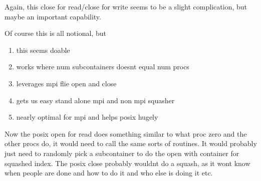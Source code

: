 Again, this close for read/close for write seems to be a slight
complication, but maybe an important capability.

Of course this is all notional, but

\begin{enumerate}
\item{this seems doable}
\item{works where num subcontainers doesnt equal num procs}
\item{leverages mpi flie open and close}
\item{gets us easy stand alone mpi and non mpi squasher}
\item{nearly optimal for mpi and helps posix hugely}
\end{enumerate}

Now the posix open for read does something similar to
what proc zero and the other procs do, it would need
to call the same sorts of routines.  It would probably
just need to randomly pick a subcontainer to
do the open with container for squashed index.
The posix close probably wouldnt do a squash, as it
wont know when people are done and how to do it and
who else is doing it etc.
